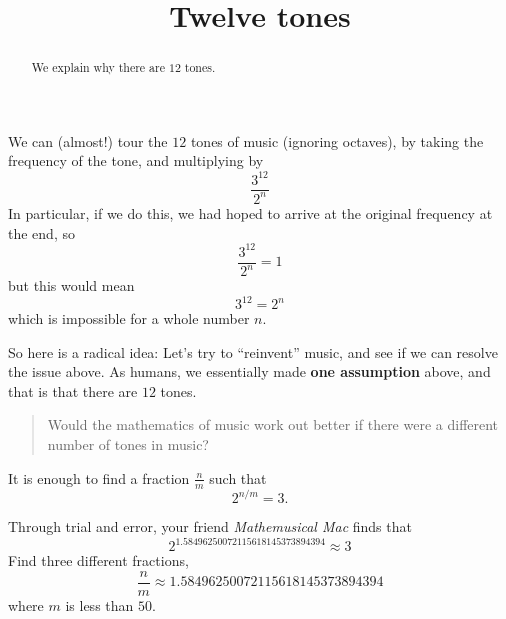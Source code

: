 \documentclass[12pt,noauthor,nooutcomes, handout]{ximera}
\author{}
\title{Twelve tones}
\begin{document}
\begin{abstract}
    We explain why there are $12$ tones.
\end{abstract}
\maketitle


    





We can (almost!) tour the $12$ tones of music (ignoring octaves), by taking the frequency of the tone, and multiplying by 
\[
\frac{3^{12}}{2^n}
\]
In particular, if we do this, we had hoped to arrive at the original frequency at the end, so 
\[
\frac{3^{12}}{2^n} =1
\]
but this would mean
\[
3^{12} = 2^n
\]
which is impossible for a whole number $n$.


So here is a radical idea: Let's try to ``reinvent'' music, and see if we can resolve the issue above. As humans, we essentially made \textbf{one assumption} above, and that is that there are $12$ tones. 
\begin{quote}
Would the mathematics of music work out better if there were a different number of tones in music? 
\end{quote}
It is enough to find a fraction $\frac{n}{m}$ such that
\[
2^{n/m} = 3.
\]








\begin{question}
Through trial and error, your friend \textit{Mathemusical Mac} finds that 
\[
2^{1.58496250072115618145373894394}\approx 3
\]
Find three different fractions, 
\[
\frac{n}{m} \approx 1.58496250072115618145373894394
\]
where $m$ is less than $50$.

\end{question}
\end{document}

